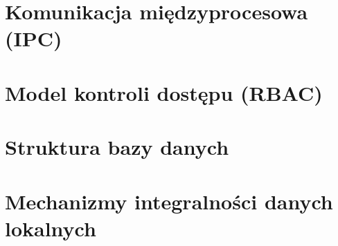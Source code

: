 \documentclass[12pt, a4paper, oneside]{report}
\begin{document}



\section{Komunikacja międzyprocesowa (IPC)}
\label{sec:ipc}



\section{Model kontroli dostępu (RBAC)}
\label{sec:rbac}



\section{Struktura bazy danych}
\label{sec:baza}




\section{Mechanizmy integralności danych lokalnych}
\label{sec:integralnosc}
\end{document}
